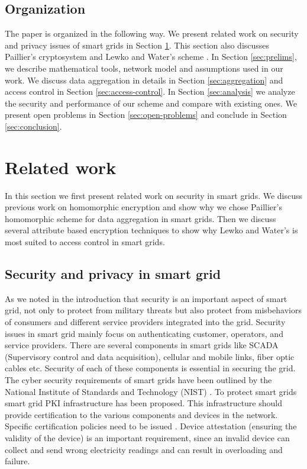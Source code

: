 \documentclass[conference]{IEEEtran}[10pt]
\begin{document}
\subsection{Organization}
The paper is organized in the following way. 
We present related work on security and privacy issues of smart grids in Section \ref{sec:related}. 
This section also discusses Paillier's cryptosystem \cite{P99} and Lewko and Water's scheme \cite{LW11}. 
In Section \ref{sec:prelims}, we describe mathematical tools, network model and assumptions used in our work. 
We discuss data aggregation in details in Section \ref{sec:aggregation} and access control in Section \ref{sec:access-control}.  
In Section \ref{sec:analysis} we analyze the security and performance of our scheme and compare with existing ones. 
We present open problems in Section \ref{sec:open-problems} and conclude in Section \ref{sec:conclusion}. 

\section{Related work}
\label{sec:related}
In this section we first present related work on security in smart grids. 
We discuss previous work on homomorphic encryption and show why we chose Paillier's \cite{P99} homomorphic scheme for data aggregation in 
smart grids. 
Then we discuss several attribute based encryption techniques
to show why Lewko and Water's \cite{LW11} is most suited to access control in smart grids. 

\subsection{Security and privacy in smart grid}
\label{subsec:security-privacy}
As we noted in the introduction that security is an important aspect of smart grid, not only to protect from military threats
but also protect from misbehaviors of consumers and different service providers integrated into the grid. 
Security issues in smart grid mainly focus on authenticating customer, operators, and service providers. 
There are several components in smart grids like SCADA (Supervisory control and data acquisition), cellular and  mobile links, 
fiber optic cables etc. Security of each of these components is essential in securing the grid.
The cyber security requirements of smart grids have been outlined by the National Institute of Standards and Technology (NIST) \cite{NIST10}. 
To protect smart grids smart grid PKI infrastructure has been proposed. 
This infrastructure should provide certification to the various components and devices in the network.
Specific certification policies need to be issued \cite{MR10}. 
Device attestation (ensuring the validity of the device) is an important requirement, since an invalid device can collect and send wrong electricity readings
and can result in overloading and failure. 
\end{document}
